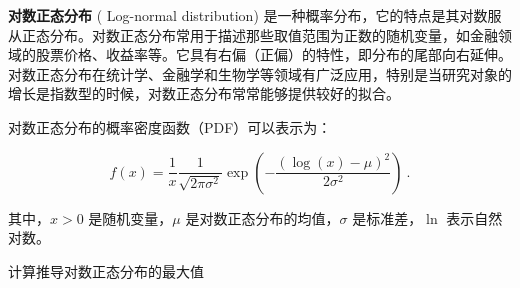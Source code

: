 
\textbf{对数正态分布} (
Log-normal distribution) 是一种概率分布，它的特点是其对数服从正态分布。对数正态分布常用于描述那些取值范围为正数的随机变量，如金融领域的股票价格、收益率等。它具有右偏（正偏）的特性，即分布的尾部向右延伸。对数正态分布在统计学、金融学和生物学等领域有广泛应用，特别是当研究对象的增长是指数型的时候，对数正态分布常常能够提供较好的拟合。

对数正态分布的概率密度函数（PDF）可以表示为：

\begin{equation}
f(x) = \frac{1}{x} \frac{1}{\sqrt{2 \pi \sigma^2}} \exp \left(-\frac{(\log (x)-\mu)^2}{2 \sigma^2}\right)~.
\end{equation}

其中，\( x > 0 \) 是随机变量，\( \mu \) 是对数正态分布的均值，\( \sigma \) 是标准差，\( \ln \) 表示自然对数。

\begin{example}{计算推导对数正态分布的最大值}

\end{example}